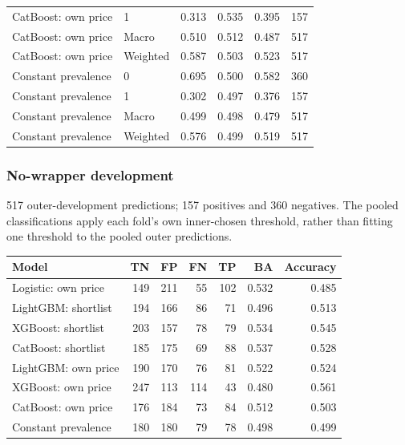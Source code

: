 \begin{longtable}{@{}p{.34\linewidth}p{.15\linewidth}rrrr@{}}
CatBoost: own price & 1 & 0.313 & 0.535 & 0.395 & 157\\
CatBoost: own price & Macro & 0.510 & 0.512 & 0.487 & 517\\
CatBoost: own price & Weighted & 0.587 & 0.503 & 0.523 & 517\\
Constant prevalence & 0 & 0.695 & 0.500 & 0.582 & 360\\
Constant prevalence & 1 & 0.302 & 0.497 & 0.376 & 157\\
Constant prevalence & Macro & 0.499 & 0.498 & 0.479 & 517\\
Constant prevalence & Weighted & 0.576 & 0.499 & 0.519 & 517\\
\bottomrule\end{longtable}\endgroup

\subsubsection*{No-wrapper development}
517 outer-development predictions; 157 positives and 360 negatives. The pooled classifications apply each fold's own inner-chosen threshold, rather than fitting one threshold to the pooled outer predictions.
\begingroup\small\setlength{\tabcolsep}{3pt}
\begin{longtable}{@{}p{.35\linewidth}rrrrrr@{}}
\toprule Model & TN & FP & FN & TP & BA & Accuracy\\\midrule\endhead
Logistic: own price & 149 & 211 & 55 & 102 & 0.532 & 0.485\\
LightGBM: shortlist & 194 & 166 & 86 & 71 & 0.496 & 0.513\\
XGBoost: shortlist & 203 & 157 & 78 & 79 & 0.534 & 0.545\\
CatBoost: shortlist & 185 & 175 & 69 & 88 & 0.537 & 0.528\\
LightGBM: own price & 190 & 170 & 76 & 81 & 0.522 & 0.524\\
XGBoost: own price & 247 & 113 & 114 & 43 & 0.480 & 0.561\\
CatBoost: own price & 176 & 184 & 73 & 84 & 0.512 & 0.503\\
Constant prevalence & 180 & 180 & 79 & 78 & 0.498 & 0.499\\
\bottomrule\end{longtable}\endgroup
\begingroup\small\setlength{\tabcolsep}{3pt}

